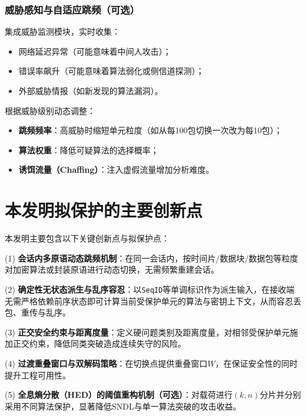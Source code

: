 \documentclass[12pt,a4paper]{article}
\begin{document}
\subsubsection{威胁感知与自适应跳频（可选）}

集成威胁监测模块，实时收集：

\begin{itemize}
    \item 网络延迟异常（可能意味着中间人攻击）；
    \item 错误率飙升（可能意味着算法弱化或侧信道探测）；
    \item 外部威胁情报（如新发现的算法漏洞）。
\end{itemize}

根据威胁级别动态调整：

\begin{itemize}
    \item \textbf{跳频频率}：高威胁时缩短单元粒度（如从每100包切换一次改为每10包）；
    \item \textbf{算法权重}：降低可疑算法的选择概率；
    \item \textbf{诱饵流量（Chaffing）}：注入虚假流量增加分析难度。
\end{itemize}

\section{本发明拟保护的主要创新点}

本发明主要包含以下关键创新点与拟保护点：

(1) \textbf{会话内多原语动态跳频机制}：在同一会话内，按时间片/数据块/数据包等粒度对加密算法或封装原语进行动态切换，无需频繁重建会话。

(2) \textbf{确定性无状态派生与乱序容忍}：以\texttt{SeqID}等单调标识作为派生输入，在接收端无需严格依赖前序状态即可计算当前受保护单元的算法与密钥上下文，从而容忍丢包、重传与乱序。

(3) \textbf{正交安全约束与距离度量}：定义硬问题类别及距离度量，对相邻受保护单元施加正交约束，降低同类突破造成连续失守的风险。

(4) \textbf{过渡重叠窗口与双解码策略}：在切换点提供重叠窗口$W$，在保证安全性的同时提升工程可用性。

(5) \textbf{全息熵分散（HED）的阈值重构机制（可选）}：对载荷进行$(k,n)$分片并分别采用不同算法保护，显著降低SNDL与单一算法突破的攻击收益。
\end{document}
